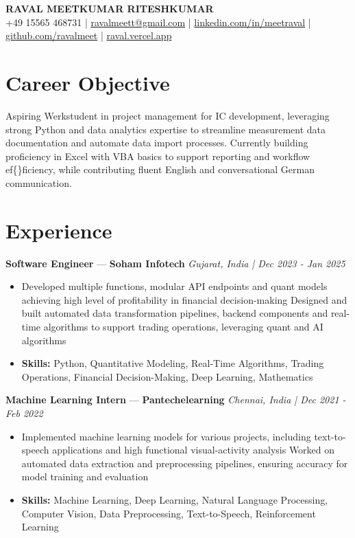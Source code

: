 \documentclass[a4paper,10pt]{article}
\begin{document}
\begin{center}
  {\Large\bfseries RAVAL MEETKUMAR RITESHKUMAR}\\[2pt]
  {\small +49 15565 468731 \;|\; \href{mailto:ravalmeett@gmail.com}{ravalmeett@gmail.com} \;|\; \href{https://www.linkedin.com/in/meetraval/}{linkedin.com/in/meetraval} \;|\; \href{https://github.com/ravalmeet}{github.com/ravalmeet} \;|\; \href{https://raval.vercel.app/}{raval.vercel.app}}
\end{center}
\vspace{-3pt}

\section*{Career Objective}
Aspiring Werkstudent in project management for IC development, leveraging strong Python and data analytics expertise to streamline measurement data documentation and automate data import processes. Currently building proficiency in Excel with VBA basics to support reporting and workflow ef\{\}ficiency, while contributing fluent English and conversational German communication.\par

\section*{Experience}
\textbf{Software Engineer} — \textbf{Soham Infotech} \hfill \textit{Gujarat, India \;|\; Dec 2023 - Jan 2025}\par
\vspace{1pt}
\begin{itemize}
  \item Developed multiple functions, modular API endpoints and quant models achieving high level of profitability in financial decision-making Designed and built automated data transformation pipelines, backend components and real-time algorithms to support trading operations, leveraging quant and AI algorithms
  \item \textbf{Skills:} Python, Quantitative Modeling, Real-Time Algorithms, Trading Operations, Financial Decision-Making, Deep Learning, Mathematics
\end{itemize}
\vspace{3pt}
\textbf{Machine Learning Intern} — \textbf{Pantechelearning} \hfill \textit{Chennai, India \;|\; Dec 2021 - Feb 2022}\par
\vspace{1pt}
\begin{itemize}
  \item Implemented machine learning models for various projects, including text-to-speech applications and high functional visual-activity analysis Worked on automated data extraction and preprocessing pipelines, ensuring accuracy for model training and evaluation
  \item \textbf{Skills:} Machine Learning, Deep Learning, Natural Language Processing, Computer Vision, Data Preprocessing, Text-to-Speech, Reinforcement Learning
\end{itemize}
\end{document}
